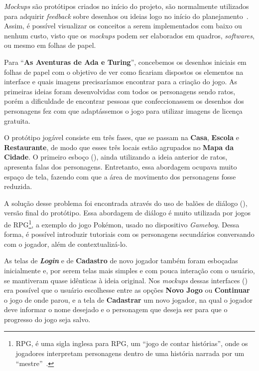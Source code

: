 \textit{Mockups} são protótipos criados no início do projeto, são normalmente utilizados para adquirir \textit{feedback} sobre desenhos ou ideias logo no início do planejamento~\cite{interaction_design_foundation_mock-ups_nodate}. Assim, é possível visualizar os conceitos a serem implementados com baixo ou nenhum custo, visto que os \textit{mockups} podem ser elaborados em quadros, \textit{softwares}, ou mesmo em folhas de papel.

Para “\textbf{As Aventuras de Ada e Turing}”, concebemos os desenhos iniciais em folhas de papel com o objetivo de ver como ficariam dispostos os elementos na interface e quais imagens precisaríamos encontrar para a criação do jogo. As primeiras ideias foram desenvolvidas com todos os personagens sendo ratos, porém a dificuldade de encontrar pessoas que confeccionassem os desenhos dos personagens fez com que adaptássemos o jogo para utilizar imagens de licença gratuita.

O protótipo jogável consiste em três fases, que se passam na \textbf{Casa}, \textbf{Escola} e \textbf{Restaurante}, de modo que esses três locais estão agrupados no \textbf{Mapa da Cidade}. O primeiro esboço (), ainda utilizando a ideia anterior de ratos, apresenta falas dos personagens. Entretanto, essa abordagem ocupava muito espaço de tela, fazendo com que a área de movimento dos personagens fosse reduzida. 


A solução desse problema foi encontrada através do uso de balões de diálogo (), versão final do protótipo. Essa abordagem de diálogo é muito utilizada por jogos de \acrshort{RPG}\footnote{\acrshort{RPG}, é uma sigla inglesa para \acrlong{RPG}, um “jogo de contar histórias”, onde os jogadores interpretam personagens dentro de uma história narrada por um “mestre”~\cite{cabalero_o_2007}.}, a exemplo do jogo Pokémon, usado no dispositivo \textit{Gameboy}. Dessa forma, é possível introduzir tutoriais com os personagens secundários conversando com o jogador, além de contextualizá-lo.


As telas de \textit{\textbf{Login}} e de \textbf{Cadastro} de novo jogador também foram esboçadas inicialmente e, por serem telas mais simples e com pouca interação com o usuário, se mantiveram quase idênticas à ideia original. Nos \textit{mockups} dessas interfaces () era possível que o usuário escolhesse entre as opções \textbf{Novo Jogo} ou \textbf{Continuar} o jogo de onde parou, e a tela de \textbf{Cadastrar} um novo jogador, na qual o jogador deve informar o nome desejado e o personagem que deseja ser para que o progresso do jogo seja salvo.

